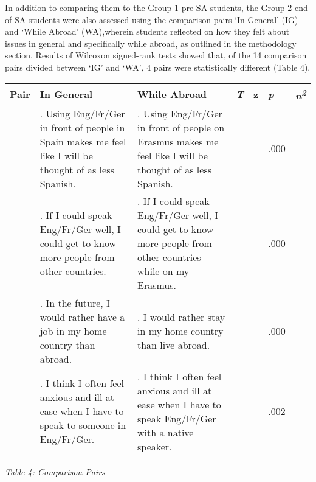 \documentclass[12pt]{article}
\newenvironment{styleStandard}{\setlength\leftskip{0cm}\setlength\rightskip{0cm plus 1fil}\setlength\parindent{0cm}\setlength\parfillskip{0pt plus 1fil}\setlength\parskip{0in plus 1pt}\writerlistparindent\writerlistleftskip\leavevmode\normalfont\normalsize\writerlistlabel\ignorespaces}{\unskip\vspace{0.111in plus 0.0111in}\par}
\newcommand\writerlistleftskip{}
\newcommand\writerlistparindent{}
\newcommand\writerlistlabel{}
\begin{document}
\begin{styleStandard}
In addition to comparing them to the Group 1 pre-SA students, the Group 2 end of SA students were also assessed using the comparison pairs ‘In General’ (IG) and ‘While Abroad’ (WA),wherein students reflected on how they felt about issues in general and specifically while abroad, as outlined in the methodology section. Results of Wilcoxon signed-rank tests showed that, of the 14 comparison pairs divided between ‘IG’ and ‘WA’, 4 pairs were statistically different (Table 4). 
\end{styleStandard}

\begin{flushleft}
\tablehead{}
\begin{supertabular}{m{0.38795984in}|m{1.4733598in}|m{1.5608599in}|m{0.63725984in}|m{0.46365985in}|m{0.37815985in}|m{0.5448598in}|}
\hline
\bfseries Pair &
\bfseries In General &
\bfseries While Abroad &
\bfseries \textit{T} &
\bfseries z &
\bfseries \textit{p} &
\bfseries \textit{n}\textit{\textsuperscript{2}}\\\hline
{} &
. Using Eng/Fr/Ger in front of people in Spain makes me feel like I will be thought of as less Spanish. &
. Using Eng/Fr/Ger in front of people on Erasmus makes me feel like I will be thought of as less Spanish. &
 &
 &
\mdseries .000 &
\\\hline
{} &
. If I could speak Eng/Fr/Ger well, I could get to know more people from other countries. &
. If I could speak Eng/Fr/Ger well, I could get to know more people from other countries while on my Erasmus. &
 &
 &
\mdseries .000 &
\\\hline
{} &
. In the future, I would rather have a job in my home country than abroad. &
. I would rather stay in my home country than live abroad. &
 &
 &
\mdseries .000 &
\\\hline
{} &
. I think I often feel anxious and ill at ease when I have to speak to someone in Eng/Fr/Ger. &
. I think I often feel anxious and ill at ease when I have to speak Eng/Fr/Ger with a native speaker. &
 &
{}

 &
\mdseries .002 &
\\\hline
\end{supertabular}
\end{flushleft}
\begin{styleStandard}
\textit{Table 4: Comparison Pairs}
\end{styleStandard}
\end{document}
